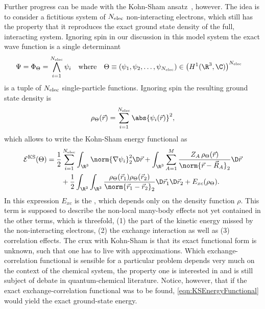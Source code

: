 Further progress can be made with the Kohn-Sham ansatz~\cite{Kohn1965}, however.
The idea is to consider a fictitious system of
$N_\text{elec}$ non-interacting electrons,
which still has the property that it reproduces the exact
ground state density of the full, interacting system.
Ignoring spin in our discussion
in this model system the exact wave function is a single determinant
\begin{align*}
	\Psi &= \Phi_\Theta = \bigwedge_{i=1}^{\Nelec} \psi_i
	&&\text{where}&
	\Theta \equiv \left(\psi_1, \psi_2, \ldots, \psi_{\Nelec}\right)
	&\in \left(H^1(\R^3, \C)\right)^{\Nelec}
\end{align*}
is a tuple of $N_\text{elec}$ single-particle functions.
Ignoring spin the resulting ground state density is
\[
	\rho_\Theta(\vec{r}) = \sum_{i=1}^{\Nelec} \abs{\psi_i(\vec{r})}^2,
\]
which allows to write the Kohn-Sham energy functional as
\begin{equation}
	\begin{aligned}
	\mathcal{E}^\text{KS}(\Theta)
	&= \frac12 \sum_{i=1}^{\Nelec} \int_{\R^3} \norm{\nabla \psi_i}_2^2 \D\vec{r}
	+ \int_{\R^3} \sum_{A=1}^M
		\frac{Z_A \, \rho_\Theta(\vec{r})}{\norm{\vec{r} - \vec{R}_A}_2} \D\vec{r} \\
	&\hspace{20pt}
	+ \frac12 \int_{\R^3}\int_{\R^3}
		\frac{\rho_\Theta(\vec{r}_1) \rho_\Theta(\vec{r}_2)}
			{\norm{\vec{r}_1 - \vec{r}_2}_2} \D\vec{r}_1 \D\vec{r}_2
	+ E_{xc}(\rho_\Theta).
	\end{aligned}
	\label{eqn:KSEnergyFunctional}
\end{equation}
In this expression $E_{xc}$ is the ,
which depends only on the density function $\rho$.
This term is supposed to describe the non-local
many-body effects not yet contained in the other terms,
which is threefold,
(1) the part of the kinetic energy missed by the non-interacting electrons,
(2) the exchange interaction as well as (3) correlation effects.
The crux with Kohn-Sham \DFT is that its exact functional form is unknown,
such that one has to live with approximations.
Which exchange-correlation functional is sensible for a particular
problem depends very much on the context of the chemical system,
the property one is interested in and is still subject of debate
in quantum-chemical literature.
Notice, however, that if the exact exchange-correlation functional was to be found,
\eqref{eqn:KSEnergyFunctional} would yield the exact ground-state energy.

